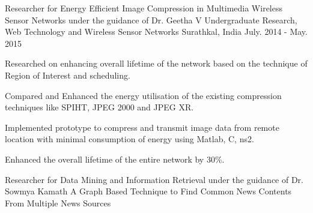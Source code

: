 \begin{cventries}
  \cventry
    {Researcher for Energy Efficient Image Compression in Multimedia Wireless Sensor Networks under the guidance of Dr. Geetha V}
    {Undergraduate Research, Web Technology and Wireless Sensor Networks}
    {Surathkal, India}
    {July. 2014 - May. 2015}
    {
      \begin{cvitems}
        \item {Researched on enhancing overall lifetime of the network based on the technique of Region of Interest and scheduling.}
        \item{Compared and Enhanced the energy utilisation of the existing compression techniques like SPIHT, JPEG 2000 and JPEG XR.}
        \item {Implemented prototype to compress and transmit image data from remote location with minimal consumption of energy using Matlab, C, ns2.}
        \item{Enhanced the overall lifetime of the entire network by 30\%.}
      \end{cvitems} 
    }
  \cventry
    {Researcher for Data Mining and Information Retrieval under the guidance of Dr. Sowmya Kamath}
    {A Graph Based Technique to Find Common News Contents From Multiple News Sources}

\end{cventries}
